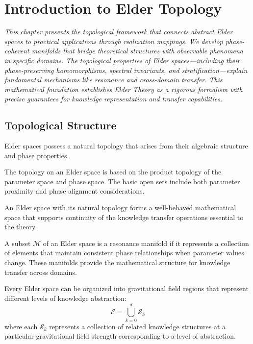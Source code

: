 \chapter{Introduction to Elder Topology}

\textit{This chapter presents the topological framework that connects abstract Elder spaces to practical applications through realization mappings. We develop phase-coherent manifolds that bridge theoretical structures with observable phenomena in specific domains. The topological properties of Elder spaces—including their phase-preserving homomorphisms, spectral invariants, and stratification—explain fundamental mechanisms like resonance and cross-domain transfer. This mathematical foundation establishes Elder Theory as a rigorous formalism with precise guarantees for knowledge representation and transfer capabilities.}

\section{Topological Structure}

Elder spaces possess a natural topology that arises from their algebraic structure and phase properties.

\begin{definition}
The topology on an Elder space is based on the product topology of the parameter space and phase space. The basic open sets include both parameter proximity and phase alignment considerations.
\end{definition}

\begin{theorem}
An Elder space with its natural topology forms a well-behaved mathematical space that supports continuity of the knowledge transfer operations essential to the theory.
\end{theorem}

\begin{definition}
A subset $\mathcal{M}$ of an Elder space is a resonance manifold if it represents a collection of elements that maintain consistent phase relationships when parameter values change. These manifolds provide the mathematical structure for knowledge transfer across domains.
\end{definition}

\begin{theorem}
Every Elder space can be organized into gravitational field regions that represent different levels of knowledge abstraction:
\begin{equation}
\mathcal{E} = \bigcup_{k=0}^{d} \mathcal{S}_k
\end{equation}
where each $\mathcal{S}_k$ represents a collection of related knowledge structures at a particular gravitational field strength corresponding to a level of abstraction.
\end{theorem}

